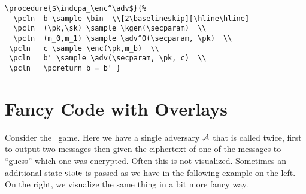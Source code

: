 \documentclass[a4paper]{report}
\begin{document}
\begin{center}
\end{center}

\begin{lstlisting}
\procedure{$\indcpa_\enc^\adv$}{%
  \pcln  b \sample \bin  \\[2\baselineskip][\hline\hline]
  \pcln  (\pk,\sk) \sample \kgen(\secparam)  \\
  \pcln  (m_0,m_1) \sample \adv^O(\secparam, \pk)  \\
 \pcln   c \sample \enc(\pk,m_b)  \\
 \pcln   b' \sample \adv(\secparam, \pk, c)  \\
 \pcln   \pcreturn b = b' }
\end{lstlisting}


\section{Fancy Code with Overlays}

Consider the \indcpa\ game. Here we have a single adversary $\mathcal{A}$ that is called twice, first to output two messages then
given the ciphertext of one of the messages to \enquote{guess} which one was encrypted. Often this is not visualized.
Sometimes an additional state $\mathsf{state}$ is passed as we have in the following example on the left. On the right,
we visualize the same thing in a bit more fancy way.
\end{document}
